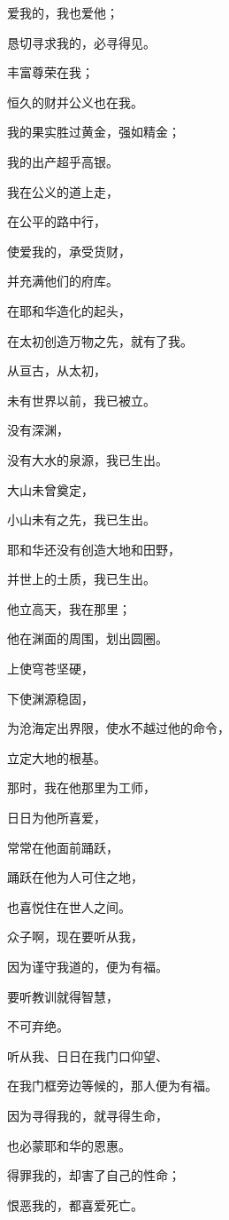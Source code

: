{\par }{\Q {}爱我的，我也爱他；
\par }{\Q 恳切寻求我的，必寻得见。
\par }{\Q {}丰富尊荣在我；
\par }{\Q 恒久的财并公义也在我。
\par }{\Q {}我的果实胜过黄金，强如精金；
\par }{\Q 我的出产超乎高银。
\par }{\Q {}我在公义的道上走，
\par }{\Q 在公平的路中行，
\par }{\Q {}使爱我的，承受货财，
\par }{\Q 并充满他们的府库。
\par }{\BB \par }{\Q {}在耶和华造化的起头，
\par }{\Q 在太初创造万物之先，就有了我。
\par }{\Q {}从亘古，从太初，
\par }{\Q 未有世界以前，我已被立。
\par }{\Q {}没有深渊，
\par }{\Q 没有大水的泉源，我已生出。
\par }{\Q {}大山未曾奠定，
\par }{\Q 小山未有之先，我已生出。
\par }{\Q {}耶和华还没有创造大地和田野，
\par }{\Q 并世上的土质，我已生出。
\par }{\Q {}他立高天，我在那里；
\par }{\Q 他在渊面的周围，划出圆圈。
\par }{\Q {}上使穹苍坚硬，
\par }{\Q 下使渊源稳固，
\par }{\Q {}为沧海定出界限，使水不越过他的命令，
\par }{\Q 立定大地的根基。
\par }{\Q {}那时，我在他那里为工师，
\par }{\Q 日日为他所喜爱，
\par }{\Q 常常在他面前踊跃，
\par }{\Q {}踊跃在他为人{}可住之地，
\par }{\Q 也喜悦住在世人之间。
\par }{\BB \par }{\Q {}众子啊，现在要听从我，
\par }{\Q 因为谨守我道的，便为有福。
\par }{\Q {}要听教训就得智慧，
\par }{\Q 不可弃绝。
\par }{\Q {}听从我、日日在我门口仰望、
\par }{\Q 在我门框旁边等候的，那人便为有福。
\par }{\Q {}因为寻得我的，就寻得生命，
\par }{\Q 也必蒙耶和华的恩惠。
\par }{\Q {}得罪我的，却害了自己的性命；
\par }{\Q 恨恶我的，都喜爱死亡。

}
